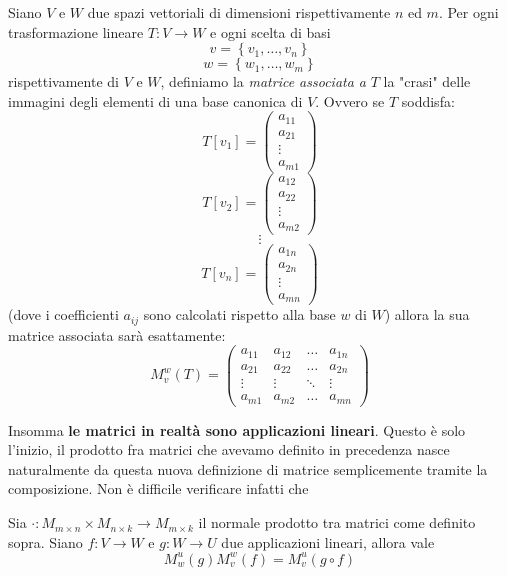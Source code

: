 \documentclass[11pt]{scrartcl}
\begin{document}
 	 \begin{definition}
 	 	Siano $V$ e $W$ due spazi vettoriali di dimensioni rispettivamente $n$ ed $m$. Per ogni trasformazione lineare $T:V\to W$ e ogni scelta di basi 
 	 	$$v=\left\{v_1,\dots,v_n\right\}$$
 	 	$$w=\left\{w_1,\dots,w_m\right\}$$
 	 	rispettivamente di $V$ e $W$, definiamo la \textit{matrice associata a} $T$ la "crasi" delle immagini degli elementi di una base canonica di $V$. Ovvero se $T$ soddisfa:
 	 	$$T\left[v_1\right]=
 	 	\begin{pmatrix}
	 	 	a_{11} \\
	 	 	a_{21} \\
	 	 	\vdots \\
	 	 	a_{m1}
 	 	\end{pmatrix}
 	 	$$
 	 	$$
 	 	T\left[v_2\right]=
 	 	\begin{pmatrix}
 	 		a_{12} \\
 	 		a_{22} \\
 	 		\vdots \\
 	 		a_{m2}
 	 	\end{pmatrix}
 	 	$$
 	 	$$\vdots$$
 	 	$$
 	 	T\left[v_n\right]=
 	 	\begin{pmatrix}
 	 		a_{1n} \\
 	 		a_{2n} \\
 	 		\vdots \\
 	 		a_{mn}
 	 	\end{pmatrix}
 	 	$$
 	 	(dove i coefficienti $a_{ij}$ sono calcolati rispetto alla base $w$ di $W$) allora la sua matrice associata sarà esattamente:
 	 	$$
 	 	M_v^w(T)=
 	 	\begin{pmatrix}
 	 		a_{11} & a_{12} & \dots & a_{1n} \\
 	 		a_{21} & a_{22} & \dots & a_{2n} \\
 	 		\vdots & \vdots & \ddots& \vdots \\
 	 		a_{m1} & a_{m2} & \dots & a_{mn}
 	 	\end{pmatrix}$$
 	 \end{definition}
 	 Insomma \textbf{le matrici in realtà sono applicazioni lineari}. Questo è solo l'inizio, il prodotto fra matrici che avevamo definito in precedenza nasce naturalmente da questa nuova definizione di matrice semplicemente tramite la composizione. Non è difficile verificare infatti che
 	 \begin{lemma}
 	 	Sia $\cdot:M_{m\times n}\times M_{n\times k}\to M_{m\times k}$ il normale prodotto tra matrici come definito sopra. Siano $f:V\to W$ e $g:W\to U$ due applicazioni lineari, allora vale
 	 	$$M_w^u(g)M_v^w(f)=M_v^u(g\circ f)$$
 	 \end{lemma}
\end{document}
